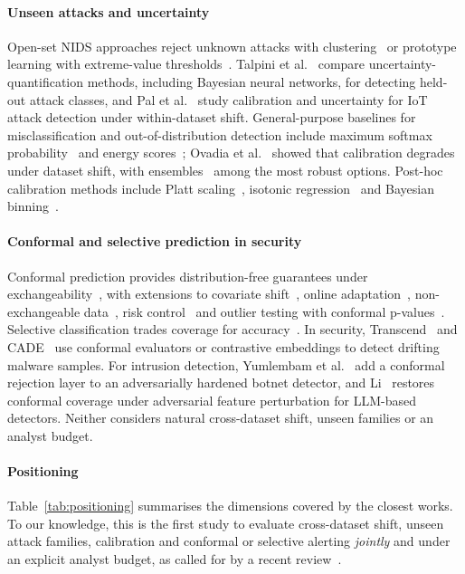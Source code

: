 \paragraph{Unseen attacks and uncertainty} Open-set NIDS approaches reject unknown attacks with clustering~\cite{farrukh2023detecting} or prototype learning with extreme-value thresholds~\cite{yu2025industrial}. Talpini et al.~\cite{talpini2024enhancing} compare uncertainty-quantification methods, including Bayesian neural networks, for detecting held-out attack classes, and Pal et al.~\cite{pal2025calibrated} study calibration and uncertainty for IoT attack detection under within-dataset shift. General-purpose baselines for misclassification and out-of-distribution detection include maximum softmax probability~\cite{hendrycks2017baseline} and energy scores~\cite{liu2020energy}; Ovadia et al.~\cite{ovadia2019trust} showed that calibration degrades under dataset shift, with ensembles~\cite{lakshminarayanan2017simple} among the most robust options. Post-hoc calibration methods include Platt scaling~\cite{platt1999probabilistic}, isotonic regression~\cite{zadrozny2002transforming,niculescu2005predicting} and Bayesian binning~\cite{naeini2015obtaining}.

\paragraph{Conformal and selective prediction in security} Conformal prediction provides distribution-free guarantees under exchangeability~\cite{vovk2022algorithmic,lei2018distribution,angelopoulos2023conformal}, with extensions to covariate shift~\cite{tibshirani2019conformal}, online adaptation~\cite{gibbs2021adaptive}, non-exchangeable data~\cite{barber2023conformal}, risk control~\cite{angelopoulos2024conformal} and outlier testing with conformal p-values~\cite{bates2023testing}. Selective classification trades coverage for accuracy~\cite{geifman2017selective}. In security, Transcend~\cite{jordaney2017transcend,barbero2022transcending} and CADE~\cite{yang2021cade} use conformal evaluators or contrastive embeddings to detect drifting malware samples. For intrusion detection, Yumlembam et al.~\cite{yumlembam2024comprehensive} add a conformal rejection layer to an adversarially hardened botnet detector, and Li~\cite{li2026robust} restores conformal coverage under adversarial feature perturbation for LLM-based detectors. Neither considers natural cross-dataset shift, unseen families or an analyst budget.

\paragraph{Positioning} Table~\ref{tab:positioning} summarises the dimensions covered by the closest works. To our knowledge, this is the first study to evaluate cross-dataset shift, unseen attack families, calibration and conformal or selective alerting \emph{jointly} and under an explicit analyst budget, as called for by a recent review~\cite{lew2026deployment}.

